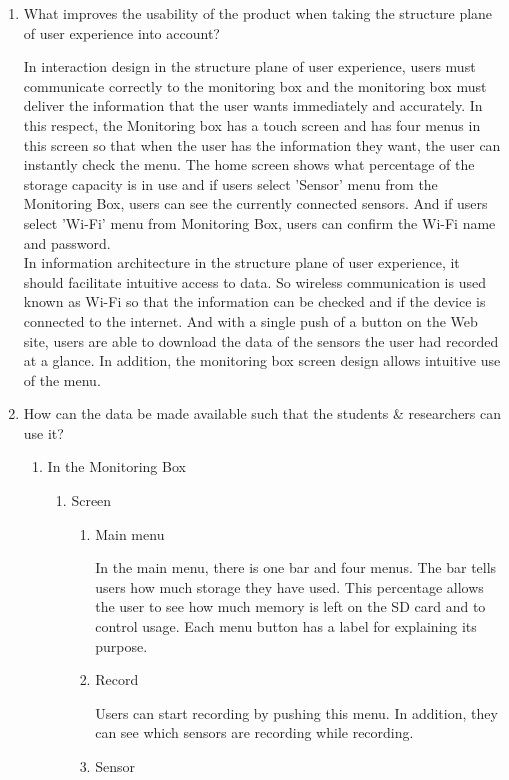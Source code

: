\documentclass[conference]{IEEEtran}
\begin{document}
\begin{enumerate}
			\item What improves the usability of the product when taking the structure plane of user experience into account?

				In interaction design in the structure plane of user experience, users must communicate correctly to the monitoring box and the monitoring box must deliver the information that the user wants immediately and accurately. In this respect, the Monitoring box has a touch screen and has four menus in this screen so that when the user has the information they want, the user can instantly check the menu. The home screen shows what percentage of the storage capacity is in use and if users select 'Sensor' menu from the Monitoring Box, users can see the currently connected sensors. And if users select 'Wi-Fi' menu from Monitoring Box, users can confirm the Wi-Fi name and password.\\
				In information architecture in the structure plane of user experience, it should facilitate intuitive access to data. So wireless communication is used known as Wi-Fi so that the information can be checked and if the device is connected to the internet. And with a single push of a button on the Web site, users are able to download the data of the sensors the user had recorded at a glance. In addition, the monitoring box screen design allows intuitive use of the menu.
\\

			\item How can the data be made available such that the students \& researchers can use it?
				\begin{enumerate}
					\item In the Monitoring Box
				\begin{enumerate}
			\item Screen
				\begin{enumerate}
					\item Main menu

						In the main menu, there is one bar and four menus. The bar tells users how much storage they have used. This percentage allows the user to see how much memory is left on the SD card and to control usage. Each menu button has a label for explaining its purpose.\\
					\item Record

						Users can start recording by pushing this menu. In addition, they can see which sensors are recording while recording.\\
					\item Sensor


\end{enumerate}
\end{enumerate}
\end{enumerate}
\end{enumerate}
\end{document}
